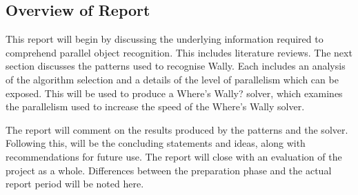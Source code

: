 \documentclass[../main.tex]{subfiles}
\begin{document}
    \subsection{Overview of Report}
    This report will begin by discussing the underlying information required to comprehend parallel object recognition.
    This includes literature reviews.
    The next section discusses the patterns used to recognise Wally.
    Each includes an analysis of the algorithm selection and a details of the level of parallelism which can be exposed.
    This will be used to produce a Where's Wally? solver, which examines the parallelism used to increase the speed of the Where's Wally solver.
    
    The report will comment on the results produced by the patterns and the solver.
    Following this, will be the concluding statements and ideas, along with recommendations for future use.
    The report will close with an evaluation of the project as a whole.
    Differences between the preparation phase and the actual report period will be noted here.
    \biblio
\end{document}
